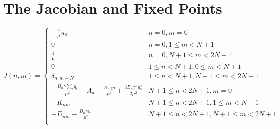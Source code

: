\documentclass[superscriptaddress, onecolumn, prl]{revtex4}
\begin{document}
\section{The Jacobian and Fixed Points}
\begin{equation}
J(n,m) = \begin{cases}
-\frac{\gamma}{\mu} u_0 & n=0, m=0 \\
0 & n=0, 1 \leq m < N + 1 \\
\frac{1}{\mu} & n=0, N + 1 \leq m < 2 N +1 \\
0 & 1 \leq n < N+1, 0 \leq m < N+1 \\
\delta_{n,m-N} & 1 \leq n < N+1, N+1 \leq m < 2N+1 \\ 
-\frac{B_n \gamma \sum_l \dot{q}_l}{\mu^2} - A_n - \frac{B_n \gamma p }{\mu^2} + \frac{3 B_n \gamma^2 u_0^2}{2 \mu^2}  & N+1 \leq n < 2N+1, m=0\\
-K_{nm} & N+1 \leq n < 2N+1, 1 \leq m < N+1 \\
-D_{nm} - \frac{B_n \gamma u_0}{\mu^2} & N+1 \leq n < 2N+1, N+1 \leq m < 2N+1 \\

\end{cases}
\end{equation}
\end{document}
